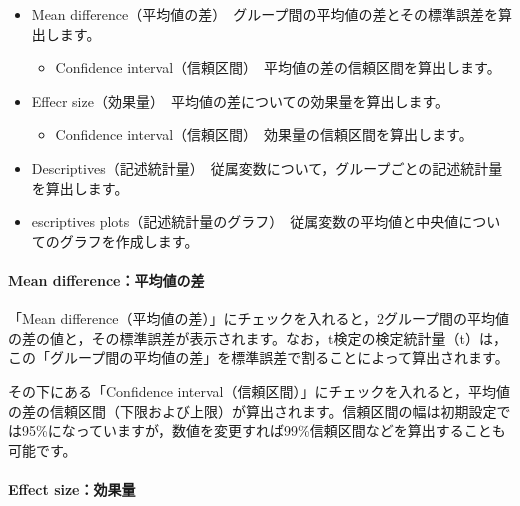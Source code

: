 \documentclass[
  12pt,
  a5jpaper,
  lualatex, ja=standard]{bxjsbook}
\providecommand{\tightlist}{%
  \setlength{\itemsep}{0pt}\setlength{\parskip}{0pt}}
\newenvironment{jmvsettings}{%
	\begin{center}%
	\begin{tcolorbox}[%
		title=設定項目,
		colframe=gmoji,
		colbacktitle=gmoji,
		colback=gmoji!2!white,
		breakable,
		width=.9\textwidth,
		]\small\addtolength{\leftmargini}{-3\labelsep}%
	}%
	{\end{tcolorbox}\end{center}}
\begin{document}
\begin{jmvsettings}

\begin{itemize}
\tightlist
\item
  Mean difference（平均値の差）　グループ間の平均値の差とその標準誤差を算出します。

  \begin{itemize}
  \tightlist
  \item
    Confidence interval（信頼区間）　平均値の差の信頼区間を算出します。
  \end{itemize}
\item
  Effecr size（効果量）　平均値の差についての効果量を算出します。

  \begin{itemize}
  \tightlist
  \item
    Confidence interval（信頼区間）　効果量の信頼区間を算出します。
  \end{itemize}
\item
  Descriptives（記述統計量）　従属変数について，グループごとの記述統計量を算出します。
\item
  escriptives plots（記述統計量のグラフ）　従属変数の平均値と中央値についてのグラフを作成します。
\end{itemize}

\end{jmvsettings}

\hypertarget{mean-differenceux5e73ux5747ux5024ux306eux5dee}{%
\paragraph*{Mean difference：平均値の差}\label{mean-differenceux5e73ux5747ux5024ux306eux5dee}}

「Mean difference（平均値の差）」にチェックを入れると，2グループ間の平均値の差の値と，その標準誤差が表示されます。なお，t検定の検定統計量（t）は，この「グループ間の平均値の差」を標準誤差で割ることによって算出されます。

その下にある「Confidence interval（信頼区間）」にチェックを入れると，平均値の差の信頼区間（下限および上限）が算出されます。信頼区間の幅は初期設定では95\%になっていますが，数値を変更すれば99\%信頼区間などを算出することも可能です。

\hypertarget{effect-sizeux52b9ux679cux91cf}{%
\paragraph*{Effect size：効果量}\label{effect-sizeux52b9ux679cux91cf}}
\end{document}
